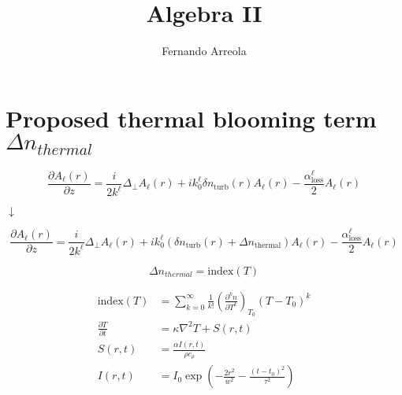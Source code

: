 \documentclass[a4paper, 12pt]{amsbook}
\title{Algebra II}
\author{Fernando Arreola}
\begin{document}
\section{Proposed thermal blooming term $ \Delta n_{thermal} $}
$$\frac{\partial A_\ell(r)}{\partial z} = \frac{i}{2k^\ell} \Delta_\perp A_\ell(r) + ik_0^\ell \delta n_{\text{turb}}(r)A_\ell(r)-\frac{\alpha^\ell_\text{loss}}{2} A_\ell(r)$$
\begin{center}
    $\downarrow$
\end{center}
$$\frac{\partial A_\ell(r)}{\partial z} = \frac{i}{2k^\ell} \Delta_\perp A_\ell(r) + ik_0^\ell( \delta n_{\text{turb}}(r) + \Delta n_{\text{thermal}})A_\ell(r)-\frac{\alpha^\ell_\text{loss}}{2} A_\ell(r)$$

$$\Delta n_{thermal} = \text{index}(T)$$

\begin{equation*}
    \begin{aligned}
       \text{index}(T) &= \sum_{k=0}^\infty \frac{1}{k!}  \left( \frac{\partial^k n}{\partial T^k} \right)_{T_0} (T-T_0)^k \\
        \frac{\partial T}{\partial t} &= \kappa \nabla^2 T + S(r,t) \\
        S(r,t) &= \frac{\alpha I(r,t)}{\rho c_\rho} \\
        I(r,t) &= I_0 \exp \left( -\frac{2r^2}{w^2}- \frac{(t-t_0)^2}{\tau^2} \right)
    \end{aligned}
\end{equation*}
\end{document}

